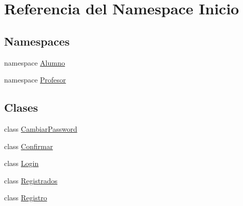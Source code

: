 \hypertarget{namespaceInicio}{}\section{Referencia del Namespace Inicio}
\label{namespaceInicio}
\subsection*{Namespaces}
\begin{DoxyCompactItemize}
\item 
namespace \mbox{\hyperlink{namespaceInicio_1_1Alumno}{Alumno}}
\item 
namespace \mbox{\hyperlink{namespaceInicio_1_1Profesor}{Profesor}}
\end{DoxyCompactItemize}
\subsection*{Clases}
\begin{DoxyCompactItemize}
\item 
class \mbox{\hyperlink{classInicio_1_1CambiarPassword}{Cambiar\+Password}}
\item 
class \mbox{\hyperlink{classInicio_1_1Confirmar}{Confirmar}}
\item 
class \mbox{\hyperlink{classInicio_1_1Login}{Login}}
\item 
class \mbox{\hyperlink{classInicio_1_1Registrados}{Registrados}}
\item 
class \mbox{\hyperlink{classInicio_1_1Registro}{Registro}}
\end{DoxyCompactItemize}
